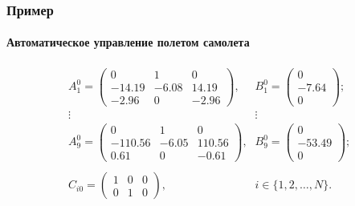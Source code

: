 \documentclass[ignorenonframetext,hyperref={pdftex,unicode},compress,handout]{beamer}
\begin{document}
\begin{frame}
    \frametitle{Пример}
    \framesubtitle{Автоматическое управление полетом самолета}
        \begin{equation*}
            \begin{array}{cc}
                A_1^0 = \left(
                    \begin{array}{ccc}
                        0     &     1     &     0 \\
                        -14.19    &     -6.08   &     14.19 \\
                        -2.96  &     0     &     -2.96
                    \end{array}
                \right)\mbox{,} &
                B_1^0 = \left(
                    \begin{array}{c}
                        0 \\
                        -7.64 \\
                        0
                    \end{array}
                \right)\mbox{;} \\
                \vdots   &   \vdots \\
                A_9^0 = \left(
                    \begin{array}{ccc}
                        0     &     1     &     0 \\
                        -110.56    &     -6.05   &     110.56 \\
                        0.61  &     0     &     -0.61
                    \end{array}
                \right)\mbox{,} &
                B_9^0 = \left(
                    \begin{array}{c}
                        0 \\
                        -53.49 \\
                        0
                    \end{array}
                \right)\mbox{;} \\ \\
                C_{i0} = \left(
                    \begin{array}{ccc}
                        1 & 0 & 0 \\
                        0 & 1 & 0
                    \end{array}
                \right)\mbox{,} &
                i \in \{1,2,\ldots,N\}\mbox{.}
            \end{array}
        \end{equation*}
\end{frame}
\end{document}
